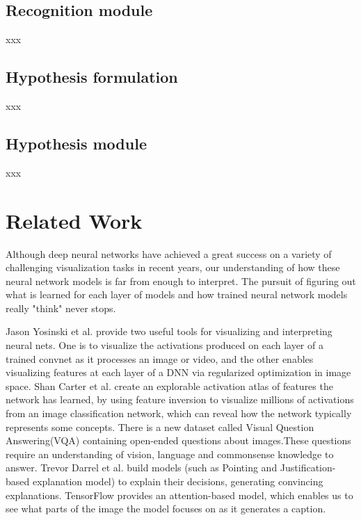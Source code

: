 \documentclass[10pt,twocolumn,letterpaper]{article}
\begin{document}
\subsection{Recognition module}
xxx

\subsection{Hypothesis formulation}
xxx

\subsection{Hypothesis module}
xxx

\section{Related Work}
Although deep neural networks have achieved a great success on a variety of challenging visualization tasks in recent years, our understanding of how these neural network models is far from enough to interpret.
The pursuit of figuring out what is learned for each layer of models and how trained neural network models really "think" never stops.

Jason Yosinski et al. provide two useful tools for visualizing and interpreting neural nets. One is to visualize  the activations produced on each layer of a trained convnet as it processes an image or video, and the other enables visualizing features at each layer of a DNN via regularized optimization in image space.
Shan Carter et al. create an explorable activation atlas of features the network has learned, by using feature inversion to visualize millions of activations from an image classification network, which can reveal how the network typically represents some concepts.
There is a new dataset called Visual Question Answering(VQA) containing open-ended questions about images.These questions require an understanding of vision, language and commonsense knowledge to answer.
Trevor Darrel et al. build  models (such as Pointing and Justification-based explanation model) to explain their decisions, generating convincing explanations.
TensorFlow provides an attention-based model, which enables us to see what parts of the image the model focuses on as it generates a caption.
\end{document}
